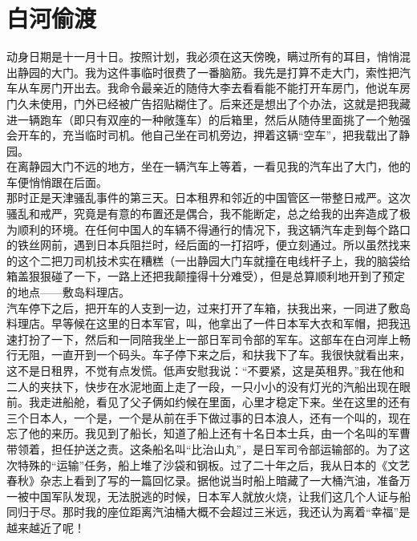 \fancyhead[RO]{} %
\fancyhead[LE]{} %
\chapter*{白河偷渡}
\thispagestyle{empty}
动身日期是十一月十日。按照计划，我必须在这天傍晚，瞒过所有的耳目，悄悄混出静园的大门。我为这件事临时很费了一番脑筋。我先是打算不走大门，索性把汽车从车房门开出去。我命令最亲近的随侍大李去看看能不能打开车房门，他说车房门久未使用，门外已经被广告招贴糊住了。后来还是想出了个办法，这就是把我藏进一辆跑车（即只有双座的一种敞篷车）的后箱里，然后从随侍里面挑了一个勉强会开车的，充当临时司机。他自己坐在司机旁边，押着这辆“空车”，把我载出了静园。\\

在离静园大门不远的地方，坐在一辆汽车上等着，一看见我的汽车出了大门，他的车便悄悄跟在后面。\\

那时正是天津骚乱事件的第三天。日本租界和邻近的中国管区一带整日戒严。这次骚乱和戒严，究竟是有意的布置还是偶合，我不能断定，总之给我的出奔造成了极为顺利的环境。在任何中国人的车辆不得通行的情况下，我这辆汽车走到每个路口的铁丝网前，遇到日本兵阻拦时，经后面的一打招呼，便立刻通过。所以虽然找来的这个二把刀司机技术实在糟糕（一出静园大门车就撞在电线杆子上，我的脑袋给箱盖狠狠碰了一下，一路上还把我颠撞得十分难受），但是总算顺利地开到了预定的地点——敷岛料理店。\\

汽车停下之后，把开车的人支到一边，过来打开了车箱，扶我出来，一同进了敷岛料理店。早等候在这里的日本军官，叫，他拿出了一件日本军大衣和军帽，把我迅速打扮了一下，然后和一同陪我坐上一部日军司令部的军车。这部车在白河岸上畅行无阻，一直开到一个码头。车子停下来之后，和扶我下了车。我很快就看出来，这不是日租界，不觉有点发慌。低声安慰我说：“不要紧，这是英租界。”我在他和二人的夹扶下，快步在水泥地面上走了一段，一只小小的没有灯光的汽船出现在眼前。我走进船舱，看见了父子俩如约候在里面，心里才稳定下来。坐在这里的还有三个日本人，一个是，一个是从前在手下做过事的日本浪人，还有一个叫的，现在忘了他的来历。我见到了船长，知道了船上还有十名日本士兵，由一个名叫的军曹带领着，担任护送之责。这条船名叫“比治山丸”，是日军司令部运输部的。为了这次特殊的“运输”任务，船上堆了沙袋和钢板。过了二十年之后，我从日本的《文艺春秋》杂志上看到了写的一篇回忆录。据他说当时船上暗藏了一大桶汽油，准备万一被中国军队发现，无法脱逃的时候，日本军人就放火烧，让我们这几个人证与船同归于尽。那时我的座位距离汽油桶大概不会超过三米远，我还认为离着“幸福”是越来越近了呢！\\

